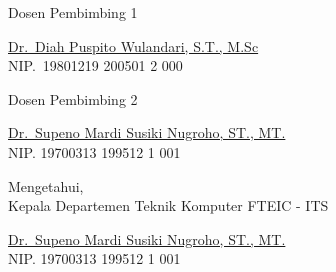 \begin{center}

  \begin{multicols}{2}

    Dosen Pembimbing 1
    \vspace{12ex}

    \underline{Dr.\ Diah Puspito Wulandari, S.T., M.Sc} \\
    NIP.\ 19801219 200501 2 000

    \columnbreak

    Dosen Pembimbing 2
    \vspace{12ex}

    \underline{Dr.\ Supeno Mardi Susiki Nugroho, ST., MT.} \\
    NIP. 19700313 199512 1 001

  \end{multicols}
  \vspace{6ex}

  Mengetahui, \\
  Kepala Departemen Teknik Komputer FTEIC - ITS
  \vspace{12ex}

  \underline{Dr.\ Supeno Mardi Susiki Nugroho, ST., MT.} \\
  NIP. 19700313 199512 1 001

\end{center}
